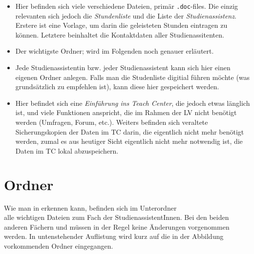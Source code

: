 \begin{itemize}
  \item {} Hier befinden sich viele verschiedene
    Dateien, primär {\tt .doc}-files. Die einzig relevanten sich jedoch
    die {\it Stundenliste} und die Liste der {\it Studienassistenz}. Erstere ist
    eine Vorlage, um darin die geleisteten Stunden eintragen zu können. Letztere
    beinhaltet die Kontaktdaten aller Studienassitenten.
  \item {} Der wichtigste Ordner; wird
    im Folgenden noch genauer erläutert.
  \item {} Jede Studienassistentin bzw.
    jeder Studienassistent kann sich hier einen eigenen Ordner anlegen.
    Falls man die Studenliste digitial führen möchte (was grundsätzlich zu
    empfehlen ist), kann diese hier gespeichert werden.
  \item {} Hier befindet sich eine 
    {\it Einführung ins Teach Center}, die jedoch etwas länglich ist, und viele
    Funktionen anspricht, die im Rahmen der LV nicht benötigt werden
    (Umfragen, Forum, etc.). Weiters befinden sich veraltete Sicherungskopien
    der Daten im TC darin, die eigentlich nicht mehr benötigt werden, zumal es
    aus heutiger Sicht eigentlich nicht mehr notwendig ist, die Daten im TC
    lokal abzuspeichern.
\end{itemize}

\section{Ordner }

Wie man in  erkennen kann, befinden sich im Unterordner\\
 alle wichtigen Dateien zum
Fach der StudienassistentInnen. Bei den beiden anderen Fächern
 und  müssen in der Regel
keine Änderungen vorgenommen werden. In untenstehender Auflistung wird kurz auf
die in der Abbildung vorkommenden Ordner eingegangen.

